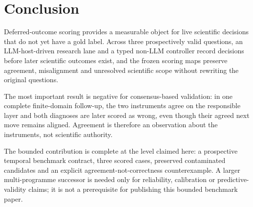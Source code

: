 \section{Conclusion}

Deferred-outcome scoring provides a measurable object for live scientific decisions that do not yet have a gold label. Across three prospectively valid questions, an LLM-host-driven research lane and a typed non-LLM controller record decisions before later scientific outcomes exist, and the frozen scoring maps preserve agreement, misalignment and unresolved scientific scope without rewriting the original questions.

The most important result is negative for consensus-based validation: in one complete finite-domain follow-up, the two instruments agree on the responsible layer and both diagnoses are later scored as wrong, even though their agreed next move remains aligned. Agreement is therefore an observation about the instruments, not scientific authority.

The bounded contribution is complete at the level claimed here: a prospective temporal benchmark contract, three scored cases, preserved contaminated candidates and an explicit agreement-not-correctness counterexample. A larger multi-programme successor is needed only for reliability, calibration or predictive-validity claims; it is not a prerequisite for publishing this bounded benchmark paper.